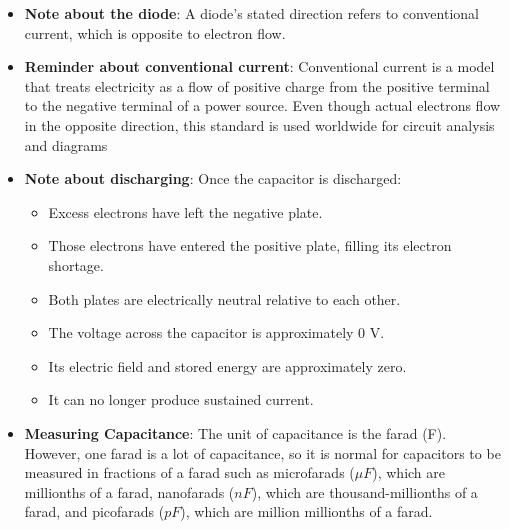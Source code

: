 \documentclass{report}
\begin{document}
\begin{itemize}
            \bigbreak \noindent 
            The resistor locally restricts charge movement. This produces a voltage drop across it and limits the current throughout the entire series circuit. Because charge cannot continuously accumulate between the LED and resistor, the same current must pass through both:
            \begin{align*}
                I_{\text{LED}} = I_{\text{resistor}}
            .\end{align*}
            It is not necessary for electrons to enter the battery’s positive terminal during the discharge phase, because the battery is no longer supplying the energy the capacitor is.
        \item \textbf{Note about the diode}: A diode’s stated direction refers to conventional current, which is opposite to electron flow.
        \item \textbf{Reminder about conventional current}: Conventional current is a model that treats electricity as a flow of positive charge from the positive terminal to the negative terminal of a power source. Even though actual electrons flow in the opposite direction, this standard is used worldwide for circuit analysis and diagrams
        \item \textbf{Note about discharging}: Once the capacitor is discharged:
            \begin{itemize}
                \item Excess electrons have left the negative plate.
                \item Those electrons have entered the positive plate, filling its electron shortage.
                \item Both plates are electrically neutral relative to each other.
                \item The voltage across the capacitor is approximately \(0\text{ V}\).
                \item Its electric field and stored energy are approximately zero.
                \item It can no longer produce sustained current.
            \end{itemize}
        \item \textbf{Measuring Capacitance}: The unit of capacitance is the farad (F). However, one farad is a lot of capacitance, so it is normal for capacitors to be measured in fractions of a farad such as microfarads ($\mu F $), which are millionths of a farad, nanofarads ($nF$), which are thousand-millionths of a farad, and picofarads ($pF$), which are million millionths of a farad.

\end{itemize}
\end{document}
